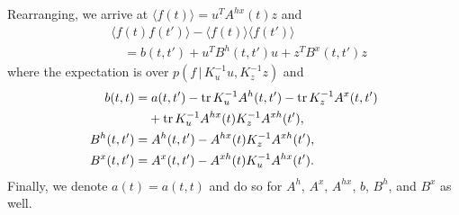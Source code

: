 \documentclass{article}
\newcommand{\tr}{\operatorname{tr}}
\newcommand{\id}[1]{\, \mathrm{d} #1}     %
\newcommand{\cond}{\, | \,}               %
\newcommand{\la}{\langle}
\newcommand{\ra}{\rangle}
\newcommand{\phan}[1]{\hphantom{#1\;}}
\begin{document}
Rearranging, we arrive at $\la f(t) \ra = u^T  A^{hx}(t) z$ and
\begin{align*}
    &\la f(t) f(t') \ra - \la f(t) \ra \la f(t') \ra \\
    &\quad = b(t,t') + u^T B^{h}(t,t') u + z^T B^{x}(t,t') z
\end{align*}
where the expectation is over $p(f\cond K_u^{-1} u, K_z^{-1} z)$ and
\begin{align*}
    b(t,t) &= a(t,t') - \tr K_u^{-1} A^{h}(t,t') - \tr K_z^{-1}A^{x}(t,t') \\
    &\phan{=} + \tr K_u^{-1}A^{hx}(t)K_z^{-1}A^{xh}(t'), \\
    B^{h}(t,t') &= A^{h}(t,t') - A^{hx}(t)K_z^{-1} A^{xh}(t'), \\
    B^{x}(t,t') &= A^{x}(t,t') - A^{xh}(t)K_u^{-1} A^{hx}(t').
\end{align*}
Finally, we denote $a(t)=a(t,t)$ and do so for $A^h$, $A^x$, $A^{hx}$, $b$, $B^h$, and $B^x$ as well.

\end{document}
